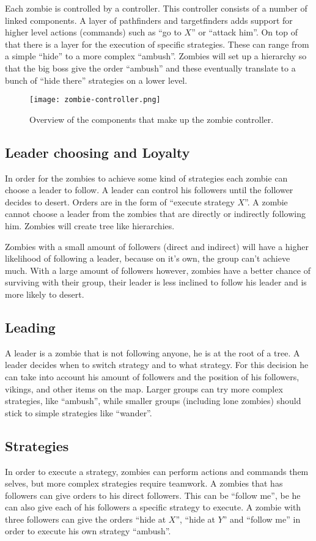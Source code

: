 Each zombie is controlled by a controller. This controller consists of a number of linked components. A layer of pathfinders and targetfinders adds support for higher level actions (commands) such as ``go to $X$'' or ``attack him''. On top of that there is a layer for the execution of specific strategies. These can range from a simple ``hide'' to a more complex ``ambush''. Zombies will set up a hierarchy so that the big boss give the order ``ambush'' and these eventually translate to a bunch of ``hide there'' strategies on a lower level.

\begin{figure}[!htb]
	\centering
	\texttt{[image: zombie-controller.png]}
	\caption{Overview of the components that make up the zombie controller.}
\end{figure}

\subsection{Leader choosing and Loyalty}
In order for the zombies to achieve some kind of strategies each zombie can choose a leader to follow. A leader can control his followers until the follower decides to desert. Orders are in the form of ``execute strategy $X$''. A zombie cannot choose a leader from the zombies that are directly or indirectly following him. Zombies will create tree like hierarchies.

Zombies with a small amount of followers (direct and indirect) will have a higher likelihood of following a leader, because on it's own, the group can't achieve much. With a large amount of followers however, zombies have a better chance of surviving with their group, their leader is less inclined to follow his leader and is more likely to desert.

\subsection{Leading}
A leader is a zombie that is not following anyone, he is at the root of a tree. A leader decides when to switch strategy and to what strategy. For this decision he can take into account his amount of followers and the position of his followers, vikings, and other items on the map. Larger groups can try more complex strategies, like ``ambush'', while smaller groups (including lone zombies) should stick to simple strategies like ``wander''.

\subsection{Strategies}
In order to execute a strategy, zombies can perform actions and commands them selves, but more complex strategies require teamwork. A zombies that has followers can give orders to his direct followers. This can be ``follow me'', be he can also give each of his followers a specific strategy to execute. A zombie with three followers can give the orders ``hide at $X$'', ``hide at $Y$'' and ``follow me'' in order to execute his own strategy ``ambush''.


